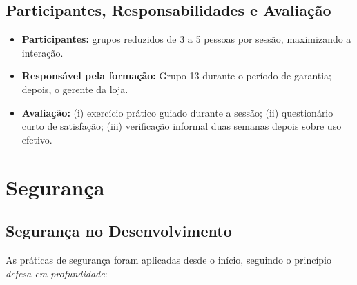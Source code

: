 \documentclass[11pt,a4paper]{report}
\begin{document}
\section{Participantes, Responsabilidades e Avaliação}

\begin{itemize}
  \item \textbf{Participantes:} grupos reduzidos de 3 a 5 pessoas por sessão, maximizando a interação.
  \item \textbf{Responsável pela formação:} Grupo 13 durante o período de garantia; depois, o gerente da loja.
  \item \textbf{Avaliação:} (i) exercício prático guiado durante a sessão; (ii) questionário curto de satisfação; (iii) verificação informal duas semanas depois sobre uso efetivo.
\end{itemize}

\chapter{Segurança}\label{cap:seguranca}

\section{Segurança no Desenvolvimento}
As práticas de segurança foram aplicadas desde o início, seguindo o princípio \textit{defesa em profundidade}:
\end{document}
